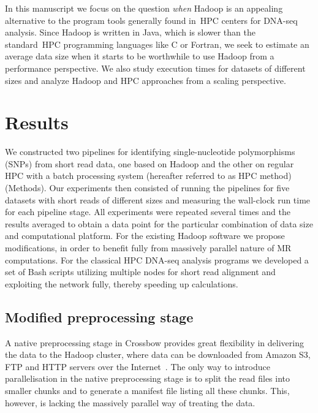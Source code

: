 \documentclass[10pt]{article}
\begin{document}
In this manuscript we focus on the question {\it when} Hadoop is an appealing alternative to the program tools generally found in~HPC centers for DNA-seq analysis. 
Since Hadoop is written in Java, which is slower than the standard~HPC programming languages like C or Fortran, we seek to estimate an average data size when it starts to be worthwhile to use Hadoop from a performance perspective. We also study execution times for datasets of different sizes and analyze Hadoop and HPC approaches from a scaling perspective.


\section*{Results}

We constructed two pipelines for identifying single-nucleotide polymorphisms (SNPs) from short read data, one based on Hadoop and the other on regular HPC with a batch processing system (hereafter referred to as HPC method) (Methods). 
Our experiments then consisted of running the pipelines for five datasets with short reads of different sizes and measuring the wall-clock run time for each pipeline stage. 
All experiments were repeated several times and the results averaged to obtain a data point for the particular combination of data size and computational platform.
For the existing Hadoop software we propose modifications, in order to benefit fully from massively parallel nature of MR computations.
For the classical HPC DNA-seq analysis programs we developed a set of Bash scripts utilizing multiple nodes for short read alignment and exploiting the network fully, thereby speeding up calculations.



\subsection*{Modified preprocessing stage}
A native preprocessing stage in Crossbow provides great flexibility in delivering the data to the Hadoop cluster, where data can be downloaded from Amazon S3, FTP and HTTP servers over the Internet~\cite{Langmead:2009kx}. The only way to introduce parallelisation in the native preprocessing stage is to split the read files into smaller chunks and to generate a manifest file listing all these chunks. This, however, is lacking the massively parallel way of treating the data.
\end{document}
